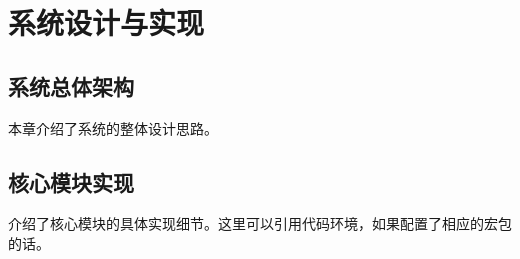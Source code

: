\chapter{系统设计与实现}
\label{chap:design}

\section{系统总体架构}
本章介绍了系统的整体设计思路。

\section{核心模块实现}
介绍了核心模块的具体实现细节。这里可以引用代码环境，如果配置了相应的宏包的话。
